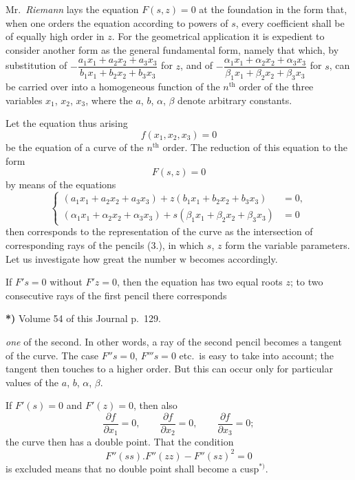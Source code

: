 \documentclass{article}
\begin{document}
Mr.\ \emph{Riemann} lays the equation $F(s, z) = 0$ at the foundation in the form that, when one orders the equation according to powers of $s$, every coefficient shall be of equally high order in $z$. For the geometrical application it is expedient to consider another form as the general fundamental form, namely that which, by substitution of $-\dfrac{a_{1}x_{1} + a_{2}x_{2} + a_{3}x_{3}}{b_{1}x_{1} + b_{2}x_{2} + b_{3}x_{3}}$ for $z$, and of $-\dfrac{\alpha_{1}x_{1} + \alpha_{2}x_{2} + \alpha_{3}x_{3}}{\beta_{1}x_{1} + \beta_{2}x_{2} + \beta_{3}x_{3}}$ for $s$, can be carried over into a homogeneous function of the $n^{\text{th}}$ order of the three variables $x_{1}$, $x_{2}$, $x_{3}$, where the $a$, $b$, $\alpha$, $\beta$ denote arbitrary constants.

Let the equation thus arising
\[ f(x_{1}, x_{2}, x_{3}) = 0 \tag{1.} \]
be the equation of a curve of the $n^{\text{th}}$ order. The reduction of this equation to the form
\[ F(s, z) = 0 \tag{2.} \]
by means of the equations
\[
\left\{
\begin{aligned}
(a_{1}x_{1} + a_{2}x_{2} + a_{3}x_{3}) + z(b_{1}x_{1} + b_{2}x_{2} + b_{3}x_{3}) &= 0, \\
(\alpha_{1}x_{1} + \alpha_{2}x_{2} + \alpha_{3}x_{3}) + s(\beta_{1}x_{1} + \beta_{2}x_{2} + \beta_{3}x_{3}) &= 0
\end{aligned}
\right.
\tag{3.}
\]
then corresponds to the representation of the curve as the intersection of corresponding rays of the pencils (3.), in which $s$, $z$ form the variable parameters. Let us investigate how great the number $\mathrm{w}$ becomes accordingly.

If $F's = 0$ without $F'z = 0$, then the equation has two equal roots $z$; to two consecutive rays of the first pencil there corresponds

\textbf{*)} Volume 54 of this Journal p.\ 129.

\emph{one} of the second. In other words, a ray of the second pencil becomes a tangent of the curve. The case $F''s = 0$, $F'''s = 0$ etc.\ is easy to take into account; the tangent then touches to a higher order. But this can occur only for particular values of the $a$, $b$, $\alpha$, $\beta$.

If $F'(s) = 0$ and $F'(z) = 0$, then also
\[ \frac{\partial f}{\partial x_{1}} = 0, \qquad \frac{\partial f}{\partial x_{2}} = 0, \qquad \frac{\partial f}{\partial x_{3}} = 0; \]
the curve then has a double point. That the condition
\[ F''(ss).F''(zz) - F''(sz)^{2} = 0 \]
is excluded means that no double point shall become a cusp${}^{*)}$.
\end{document}
